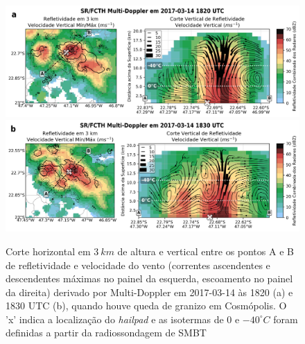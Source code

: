 \begin{figure}[htb]
	\centering
	\caption{Corte horizontal em $3\:km$ de altura e vertical entre os pontos A e B de refletividade e velocidade do vento (correntes ascendentes e descendentes máximas no painel da esquerda, escoamento no painel da direita) derivado por Multi-Doppler em 2017-03-14 às 1820 (a) e 1830 UTC (b), quando houve queda de granizo em Cosmópolis. O 'x' indica a localização do \textit{hailpad} e as isotermas de $0$ e $-40^{\circ}C$ foram definidas a partir da radiossondagem de SMBT} 
	\label{doppler_20170314_1}
	\vspace{-5pt}
	\includegraphics[width=\columnwidth]{../MultiDoppler_Processing/figures/SR-FCTH 2017-03-14 1820 UTC_ptbr.png} \\
	\vspace{-5pt}
	\includegraphics[width=\columnwidth]{../MultiDoppler_Processing/figures/SR-FCTH 2017-03-14 1830 UTC_ptbr.png} \\
\end{figure}

